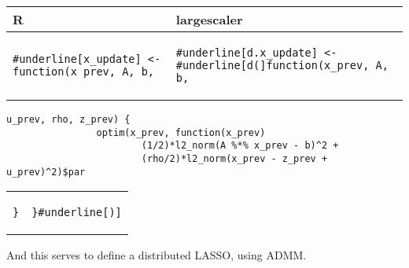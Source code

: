 \begin{table}[H]
\centering
\begin{tabular}{p{} | p{}}
R & largescaler \\ \midrule
\begin{Verbatim}[commandchars=\#\[\]]
#underline[x_update] <- function(x_prev, A, b,
\end{Verbatim}
& 
\begin{Verbatim}[commandchars=\#\[\]]
#underline[d.x_update] <- #underline[d(]function(x_prev, A, b,
\end{Verbatim}
\end{tabular}
\begin{Verbatim}[commandchars=\#\[\]]
                     u_prev, rho, z_prev) {
                optim(x_prev, function(x_prev)
                        (1/2)*l2_norm(A %*% x_prev - b)^2 +
                        (rho/2)*l2_norm(x_prev - z_prev + u_prev)^2)$par
\end{Verbatim}
\begin{tabular}{p{} | p{}}
\begin{Verbatim}[commandchars=\#\[\]]
                 }
\end{Verbatim}
&
\begin{Verbatim}[commandchars=\#\[\]]
                 }#underline[)]
\end{Verbatim}
\\
\end{tabular}
\end{table}

And this serves to define a distributed LASSO, using ADMM.